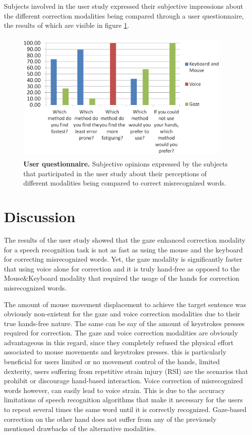 \documentclass[]{article}
\begin{document}
Subjects involved in the user study  expressed their subjective impressions about the different correction
modalities being compared through a user questionnaire, the results of which are visible in figure \ref{questionnaire}.

\begin{figure}[ht]
\begin{center}
\vspace{-3mm}
\includegraphics[width=0.95\textwidth,height=65mm]{figures/questionnaire.png}
\end{center}
\caption{\textbf{User questionnaire.} Subjective opinions expressed by the subjects that participated in the user
study about their perceptions of different modalities being compared to correct misrecognized words.}
\label{questionnaire}
\end{figure}


\section{Discussion}
The results of the user study showed that the gaze enhanced correction modality for a speech recognition task is not
as fast as using the mouse and the keyboard for correcting misrecognized words. Yet, the gaze modality is
significantly faster that using voice alone for correction and it is truly hand-free as opposed to the Mouse\&Keyboard
modality that required the usage of the hands for correction misrecognized words.

The amount of mouse movement displacement to achieve the target sentence was obviously non-existent for the gaze and
voice correction modalities due to their true hands-free nature. The same can be say of the amount of keystrokes presses
required for correction. The gaze and voice correction modalities are obviously advantageous in this regard, since they
completely refused the physical effort associated to mouse movements and keystrokes presses. this is particularly
beneficial for users limited or no movement control of the hands, limited dexterity, users suffering from
repetitive strain injury (RSI) are the scenarios that prohibit or discourage hand-based interaction. Voice correction of
misrecognized words however, can easily lead to voice strain. This is due to the accuracy limitations of speech
recognition algorithms that make it necessary for the users to repeat several times the same word  until it is correctly
recognized. Gaze-based correction on the other hand does not suffer from any of the previously mentioned drawbacks of
the alternative modalities.
\end{document}
